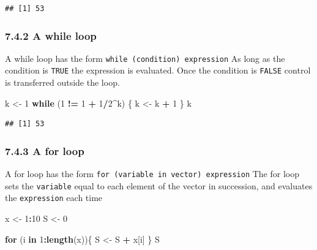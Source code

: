 \documentclass[]{article}
\newenvironment{Shaded}{\begin{snugshade}}{\end{snugshade}}
\newcommand{\KeywordTok}[1]{\textcolor[rgb]{0.13,0.29,0.53}{\textbf{#1}}}
\newcommand{\DecValTok}[1]{\textcolor[rgb]{0.00,0.00,0.81}{#1}}
\newcommand{\StringTok}[1]{\textcolor[rgb]{0.31,0.60,0.02}{#1}}
\newcommand{\ControlFlowTok}[1]{\textcolor[rgb]{0.13,0.29,0.53}{\textbf{#1}}}
\newcommand{\OperatorTok}[1]{\textcolor[rgb]{0.81,0.36,0.00}{\textbf{#1}}}
\newcommand{\NormalTok}[1]{#1}
\begin{document}
\begin{verbatim}
## [1] 53
\end{verbatim}

\subsubsection{7.4.2 A while loop}\label{a-while-loop}

A while loop has the form \texttt{while\ (condition)\ expression} As
long as the condition is \texttt{TRUE} the expression is evaluated. Once
the condition is \texttt{FALSE} control is transferred outside the loop.

\begin{Shaded}
\begin{Highlighting}[]
\NormalTok{k <-}\StringTok{ }\DecValTok{1}
\ControlFlowTok{while}\NormalTok{ (}\DecValTok{1} \OperatorTok{!=}\StringTok{ }\DecValTok{1} \OperatorTok{+}\StringTok{ }\DecValTok{1}\OperatorTok{/}\DecValTok{2}\OperatorTok{^}\NormalTok{k) \{}
\NormalTok{  k <-}\StringTok{ }\NormalTok{k }\OperatorTok{+}\StringTok{ }\DecValTok{1}
\NormalTok{\}}
\NormalTok{k}
\end{Highlighting}
\end{Shaded}

\begin{verbatim}
## [1] 53
\end{verbatim}

\subsubsection{7.4.3 A for loop}\label{a-for-loop}

A for loop has the form \texttt{for\ (variable\ in\ vector)\ expression}
The for loop sets the \texttt{variable} equal to each element of the
vector in succession, and evaluates the \texttt{expression} each time

\begin{Shaded}
\begin{Highlighting}[]
\NormalTok{x <-}\StringTok{ }\DecValTok{1}\OperatorTok{:}\DecValTok{10}
\NormalTok{S <-}\StringTok{ }\DecValTok{0}

\ControlFlowTok{for}\NormalTok{ (i }\ControlFlowTok{in} \DecValTok{1}\OperatorTok{:}\KeywordTok{length}\NormalTok{(x))\{}
\NormalTok{  S <-}\StringTok{ }\NormalTok{S }\OperatorTok{+}\StringTok{ }\NormalTok{x[i]}
\NormalTok{\}}
\NormalTok{S}
\end{Highlighting}
\end{Shaded}
\end{document}
